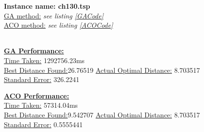 \documentclass[11pt,a4paper,final]{article}
\begin{document}
	\textbf{Instance name: ch130.tsp}\\
	\underline{GA method:} \textit{see listing \ref{GACode}}\\
	\underline{ACO method:} \textit{see listing \ref{ACOCode}}\\
	\hspace{0pt}\\
	\begin{minipage}{0.475\textwidth}
		\textbf{\underline{GA Performance:}}\\
		\underline{Time Taken:} 1292756.23ms\\
		\underline{Best Distance Found:}{\hspace{2pt}}26.76519
		\underline{Actual Optimal Distance:} 8.703517\\
		\underline{Standard Error:} 326.2241
	\end{minipage}
	\begin{minipage}{0.475\textwidth}
		\textbf{\underline{ACO Performance:}}\\
		\underline{Time Taken:} 57314.04ms\\
		\underline{Best Distance Found:}{\hspace{2pt}}9.542707
		\underline{Actual Optimal Distance:} 8.703517\\
		\underline{Standard Error:} 0.5555441
	\end{minipage}
	
\end{document}
